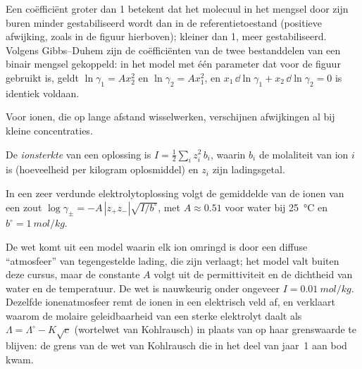 Een coëfficiënt groter dan 1 betekent dat het molecuul in het mengsel door zijn
buren minder gestabiliseerd wordt dan in de referentietoestand (positieve afwijking, zoals in de figuur
hierboven); kleiner dan 1, meer gestabiliseerd. Volgens Gibbs--Duhem zijn de coëfficiënten van de twee
bestanddelen van een binair mengsel gekoppeld: in het model met één parameter
dat voor de figuur gebruikt is, geldt $\ln\gamma_1 = Ax_2^2$ en $\ln\gamma_2 = Ax_1^2$, en
$x_1\,\dd\ln\gamma_1 + x_2\,\dd\ln\gamma_2 = 0$ is identiek voldaan.

Voor ionen, die op lange afstand wisselwerken, verschijnen afwijkingen al bij kleine
concentraties.

\begin{definition}[Ionsterkte]\label{def:b2:chemical-potential:ionic-strength}
De \emph{ionsterkte} van een oplossing is $I =
\frac12\sum_i z_i^2\,b_i$, waarin $b_i$ de molaliteit van ion $i$ is (hoeveelheid per
kilogram oplosmiddel) en $z_i$ zijn ladingsgetal.
\end{definition}

\begin{proposition}\label{prop:b2:chemical-potential:debye-huckel}
In een zeer verdunde elektrolytoplossing volgt de gemiddelde  van de
ionen van een zout $\log\gamma_\pm = -A\,|z_+z_-|\sqrt{I/b^\circ}$, met $A
\approx 0.51$ voor water bij \qty{25}{\celsius} en $b^\circ =
\qty{1}{mol/kg}$.
\end{proposition}
\admitted

\begin{remark}\label{rem:b2:chemical-potential:dh-range}
De wet komt uit een model waarin elk ion omringd is door een diffuse
``atmosfeer'' van tegengestelde lading, die zijn  verlaagt; het
model valt buiten deze cursus, maar de constante $A$ volgt uit de
permittiviteit en de dichtheid van water en de temperatuur. De wet is nauwkeurig onder
ongeveer $I = \qty{0.01}{mol/kg}$. Dezelfde ionenatmosfeer remt de ionen in
een elektrisch veld af, en verklaart waarom de molaire geleidbaarheid van een sterke
elektrolyt daalt als $\Lambda = \Lambda^\circ - K\sqrt c$ (wortelwet van
Kohlrausch) in plaats van op haar grenswaarde te blijven: de grens van de
wet van Kohlrausch die in het deel van jaar~1 aan bod kwam.
\end{remark}

